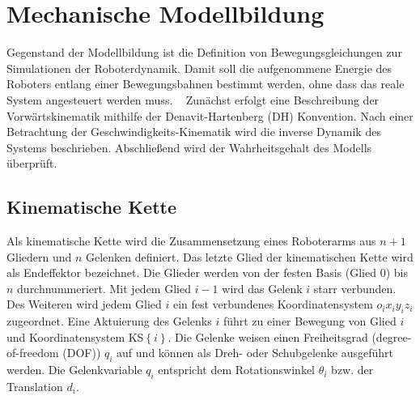 \chapter{Mechanische Modellbildung}
%
Gegenstand der Modellbildung ist die Definition von Bewegungsgleichungen zur Simulationen der Roboterdynamik. Damit soll die aufgenommene Energie des Roboters entlang einer Bewegungsbahnen bestimmt werden, ohne dass das reale System angesteuert werden muss. ~\autocite[S.~247]{Grimble.2009} Zunächst erfolgt eine Beschreibung der Vorwärtskinematik mithilfe der Denavit-Hartenberg (DH) Konvention.
Nach einer Betrachtung der Geschwindigkeits-Kinematik wird die inverse Dynamik des Systems beschrieben. 
Abschließend wird der Wahrheitsgehalt des Modells überprüft. 

\section{Kinematische Kette}
Als kinematische Kette wird die Zusammensetzung eines Roboterarms aus $n+1$ Gliedern und $n$ Gelenken definiert. Das letzte Glied der kinematischen Kette wird als Endeffektor bezeichnet. Die Glieder werden von der festen Basis (Glied $0$) bis $n$ durchnummeriert. Mit jedem Glied $i-1$ wird das Gelenk $i$ starr verbunden. Des Weiteren wird jedem Glied $i$ ein fest verbundenes Koordinatensystem $o_ix_iy_iz_i$ zugeordnet. Eine Aktuierung des Gelenks $i$ führt zu einer Bewegung von Glied $i$ und Koordinatensystem KS$\left\{i\right\}$. Die Gelenke weisen einen Freiheitsgrad (degree-of-freedom (DOF)) $q_i$ auf und können als Dreh- oder Schubgelenke ausgeführt werden. Die Gelenkvariable $q_i$ entspricht dem Rotationswinkel $\theta_i$ bzw. der Translation $d_i$. 


